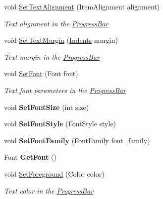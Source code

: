 \begin{DoxyCompactItemize}
void \mbox{\hyperlink{class_space_v_i_l_1_1_progress_bar_a283b2191a9a45bc001d5aa4d5249a7b4}{Set\+Text\+Alignment}} (Item\+Alignment alignment)
\begin{DoxyCompactList}\small\item\em Text alignment in the \mbox{\hyperlink{class_space_v_i_l_1_1_progress_bar}{Progress\+Bar}} \end{DoxyCompactList}\item 
void \mbox{\hyperlink{class_space_v_i_l_1_1_progress_bar_a8129fd305910f9acb1c0d5d177f00855}{Set\+Text\+Margin}} (\mbox{\hyperlink{struct_space_v_i_l_1_1_decorations_1_1_indents}{Indents}} margin)
\begin{DoxyCompactList}\small\item\em Text margin in the \mbox{\hyperlink{class_space_v_i_l_1_1_progress_bar}{Progress\+Bar}} \end{DoxyCompactList}\item 
void \mbox{\hyperlink{class_space_v_i_l_1_1_progress_bar_a97819041fe132c67cfca2b960d07a24c}{Set\+Font}} (Font font)
\begin{DoxyCompactList}\small\item\em Text font parameters in the \mbox{\hyperlink{class_space_v_i_l_1_1_progress_bar}{Progress\+Bar}} \end{DoxyCompactList}\item 
\mbox{\label{class_space_v_i_l_1_1_progress_bar_a27ec8eeb6379d7a91a3337f2545a1ae5}} 
void {\bfseries Set\+Font\+Size} (int size)
\item 
\mbox{\label{class_space_v_i_l_1_1_progress_bar_a8966ef49ff1d4cd3e487aad7faffd71e}} 
void {\bfseries Set\+Font\+Style} (Font\+Style style)
\item 
\mbox{\label{class_space_v_i_l_1_1_progress_bar_a1221d626049811fe424883a135dbc005}} 
void {\bfseries Set\+Font\+Family} (Font\+Family font\+\_\+family)
\item 
\mbox{\label{class_space_v_i_l_1_1_progress_bar_aa1b43c656b31d57ded4b9ffb8cf6c5ed}} 
Font {\bfseries Get\+Font} ()
\item 
void \mbox{\hyperlink{class_space_v_i_l_1_1_progress_bar_a0f02716ed6e2bd89e2dcf9ca6c575b84}{Set\+Foreground}} (Color color)
\begin{DoxyCompactList}\small\item\em Text color in the \mbox{\hyperlink{class_space_v_i_l_1_1_progress_bar}{Progress\+Bar}} \end{DoxyCompactList}\item 

\end{DoxyCompactItemize}
